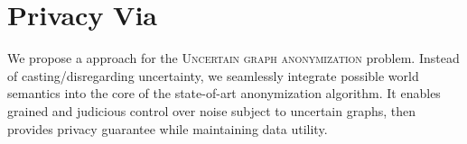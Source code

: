 \section{Privacy Via {\methodName}}

We propose a approach for the \textsc{Uncertain graph anonymization} problem. Instead of casting/disregarding uncertainty, we seamlessly integrate possible world semantics into the core of the state-of-art anonymization algorithm. It enables grained and judicious control over noise subject to uncertain graphs, then provides privacy guarantee while maintaining data utility. 




 









